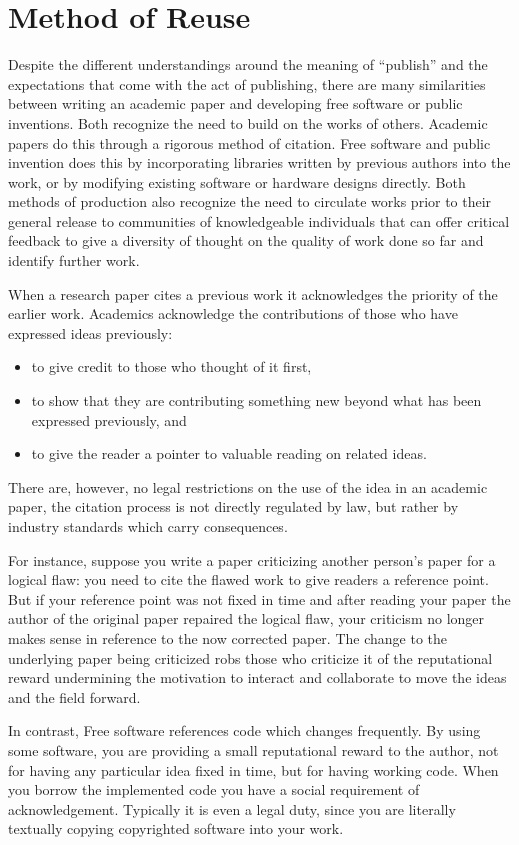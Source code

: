 \documentclass[
	fontsize=10pt, %
	twoside=false, %
	secnumdepth=1, %
]{kaobook}
\begin{document}
\section{Method of Reuse}

Despite the different understandings around the meaning of “publish”
and the expectations that come with the act of publishing, there are
many similarities between writing an academic paper and developing
free software or public inventions. Both recognize the need to build on the works of
others. Academic papers do this through a rigorous method of
citation. Free software and public invention does this by incorporating libraries written
by previous authors into the work, or by modifying existing software or hardware designs
directly. Both methods of production also recognize the need to
circulate works prior to their general release to communities of
knowledgeable individuals that can offer critical feedback to give a
diversity of thought on the quality of work done so far and identify
further work.

When a research paper cites a previous work it acknowledges the priority of the earlier work.
Academics acknowledge the contributions of those who have expressed ideas previously:
\begin{itemize}
\item to give credit to those who thought of it first,
\item to show that they are contributing something new beyond what has been expressed previously, and
\item to give the reader a pointer to valuable reading on related ideas.
\end{itemize}
There are, however, no legal restrictions on the use of the idea in an
academic paper, the citation process is not directly regulated by law,
but rather by industry standards which carry consequences.

For instance, suppose you write a paper criticizing another person’s
paper for a logical flaw: you need to cite the flawed work to give
readers a reference point. But if your reference point was not fixed
in time and after reading your paper the author of the original paper
repaired the logical flaw, your criticism no longer makes sense in
reference to the now corrected paper. The change to the underlying
paper being criticized robs those who criticize it of the reputational
reward undermining the motivation to interact and collaborate to move
the ideas and the field forward.

In contrast, Free software references code which changes
frequently. By using some software, you are providing a small
reputational reward to the author, not for having any particular idea
fixed in time, but for having working code. When you borrow the
implemented code you have a social requirement of
acknowledgement. Typically it is even a legal duty, since you are
literally textually copying copyrighted software into your work.
\end{document}
